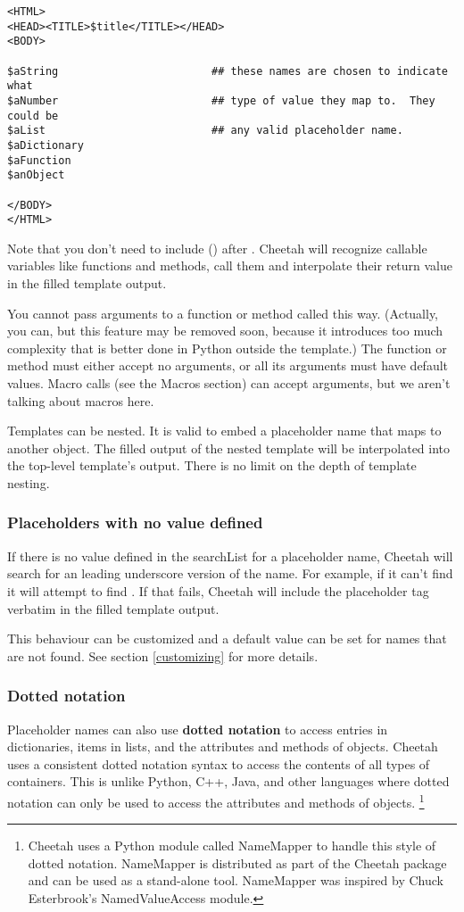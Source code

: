 \begin{verbatim}
<HTML>
<HEAD><TITLE>$title</TITLE></HEAD>
<BODY>

$aString                        ## these names are chosen to indicate what
$aNumber                        ## type of value they map to.  They could be
$aList                          ## any valid placeholder name.
$aDictionary
$aFunction
$anObject

</BODY>
</HTML>
\end{verbatim}

Note that you don't need to include () after .  Cheetah
will recognize callable variables like functions and methods, call them and
interpolate their return value in the filled template output.

You cannot pass arguments to a function or method called this way.  (Actually,
you can, but this feature may be removed soon, because it introduces too much
complexity that is better done in Python outside the template.)  The function or
method must either accept no arguments, or all its arguments must have default
values.  Macro calls (see the Macros section) can accept arguments, but we
aren't talking about macros here.

Templates can be nested. It is valid to embed a placeholder name that maps to
another  object.  The filled output of the nested template will be
interpolated into the top-level template's output.  There is no limit on the
depth of template nesting.

\subsubsection{Placeholders with no value defined}
If there is no value defined in the searchList for a placeholder name,
Cheetah will search for an leading underscore version of the name.  For
example, if it can't find  it will attempt to find
.  If that fails, Cheetah will include the placeholder
tag verbatim in the filled template output.

This behaviour can be customized and a default value can be set for names
that are not found. See section \ref{customizing} for more details.

\subsubsection{Dotted notation}
Placeholder names can also use {\bf dotted notation} to access entries in
dictionaries, items in lists, and the attributes and methods of objects.
Cheetah uses a consistent dotted notation syntax to access the contents
of all types of containers.  This is unlike Python, C++, Java, and other
languages where dotted notation can only be used to access the attributes and
methods of objects. \footnote{Cheetah uses a Python module called
  NameMapper to handle this style of dotted notation.  NameMapper is distributed
  as part of the Cheetah package and can be used as a stand-alone tool.
  NameMapper was inspired by Chuck Esterbrook's NamedValueAccess module.}

